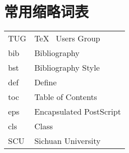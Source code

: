 \chapter{常用缩略词表}

\begin{tabular}{p{7em}p{25em}}
	TUG & \TeX~ Users Group       \\
	bib & Bibliography            \\
	bst & Bibliography Style      \\
	def & Define                  \\
	toc & Table of Contents       \\
	eps & Encapsulated PostScript \\
	cls & Class                   \\
	SCU & Sichuan University
\end{tabular}
